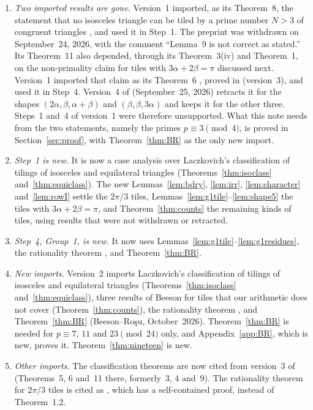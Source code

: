 \documentclass[11pt]{amsart}
\theoremstyle{remark}
\begin{document}
\begin{enumerate}
\item \emph{Two imported results are gone.} Version~1 imported, as its Theorem~8, the statement that no isosceles triangle can be tiled by a prime number $N>3$ of congruent triangles \cite[Theorem~11]{BeesonPrime}, and used it in Step~1. The preprint \cite{BeesonPrime} was withdrawn on September~24, 2026, with the comment ``Lemma~9 is not correct as stated.'' Its Theorem~11 also depended, through its Theorem~3(iv) and Theorem~1, on the non-primality claim for tiles with $3\alpha+2\beta=\pi$ discussed next. Version~1 imported that claim as its Theorem~6 \cite[Theorem~1]{BeesonPrime}, proved in \cite{Beeson2229} (version~3), and used it in Step~4. Version~4 of \cite{Beeson2229} (September~25, 2026) retracts it for the shapes $(2\alpha,\beta,\alpha+\beta)$ and $(\beta,\beta,3\alpha)$ and keeps it for the other three. Steps~1 and~4 of version~1 were therefore unsupported. What this note needs from the two statements, namely the primes $p\equiv3\pmod4$, is proved in Section~\ref{sec:proof}, with Theorem~\ref{thm:BR} as the only new import.
\item \emph{Step~1 is new.} It is now a case analysis over Laczkovich's classification of tilings of isosceles and equilateral triangles (Theorems~\ref{thm:isoclass} and~\ref{thm:equiclass}). The new Lemmas~\ref{lem:bdry}, \ref{lem:irr}, \ref{lem:character} and~\ref{lem:rowI} settle the $2\pi/3$ tiles, Lemmas~\ref{lem:g1tile}--\ref{lem:shape5} the tiles with $3\alpha+2\beta=\pi$, and Theorem~\ref{thm:counts} the remaining kinds of tiles, using results that were not withdrawn or retracted.
\item \emph{Step~4, Group~1, is new.} It now uses Lemmas~\ref{lem:g1tile}--\ref{lem:g1residues}, the rationality theorem \cite[Theorem~9]{Beeson2229}, and Theorem~\ref{thm:BR}.
\item \emph{New imports.} Version~2 imports Laczkovich's classification of tilings of isosceles and equilateral triangles (Theorems~\ref{thm:isoclass} and~\ref{thm:equiclass}), three results of Beeson for tiles that our arithmetic does not cover (Theorem~\ref{thm:counts}), the rationality theorem \cite[Theorem~9]{Beeson2229}, and Theorem~\ref{thm:BR} (Beeson--Ro\c{s}u, October~2026). Theorem~\ref{thm:BR} is needed for $p\equiv7$, $11$ and $23\pmod{24}$ only, and Appendix~\ref{app:BR}, which is new, proves it. Theorem~\ref{thm:nineteen} is new.
\item \emph{Other imports.} The classification theorems are now cited from version~3 of \cite{BLZ633} (Theorems~5, 6 and~11 there, formerly~3, 4 and~9). The rationality theorem for $2\pi/3$ tiles is cited as \cite[Theorem~1.1]{BZRat}, which has a self-contained proof, instead of Theorem~1.2.

\end{enumerate}
\end{document}
